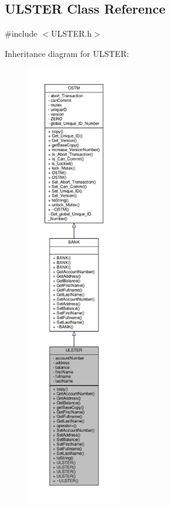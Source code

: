 \hypertarget{class_u_l_s_t_e_r}{}\subsection{U\+L\+S\+T\+ER Class Reference}
\label{class_u_l_s_t_e_r}


{\ttfamily \#include $<$U\+L\+S\+T\+E\+R.\+h$>$}



Inheritance diagram for U\+L\+S\+T\+ER\+:\nopagebreak
\begin{figure}[H]
\begin{center}
\leavevmode
\includegraphics[height=550pt]{class_u_l_s_t_e_r__inherit__graph}
\end{center}
\end{figure}


